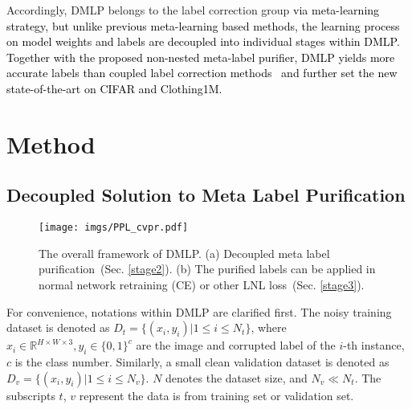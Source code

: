 \documentclass[10pt,twocolumn,letterpaper]{article}
\newcommand{\zbs}[1]{\textcolor{black}{#1}}
\begin{document}
Accordingly, DMLP belongs to the label correction group \zbs{via meta-learning strategy, but unlike previous meta-learning based methods, the learning process on model weights and labels are decoupled into individual stages within DMLP. Together with the proposed non-nested meta-label purifier, DMLP yields more accurate labels than coupled label correction methods~\cite{AAAI-2021-meta,zheng2021meta} and further set the new state-of-the-art on CIFAR and Clothing1M.}






\section{Method} \label{Method}
\subsection{Decoupled Solution to Meta Label Purification}
\begin{figure*}[!t]
\centering
\texttt{[image: imgs/PPL\_cvpr.pdf]}
\vspace{-3mm}
\caption{The overall framework of DMLP. (a) Decoupled meta label purification~(Sec. \ref{stage2}). (b) The purified labels can be applied in normal network retraining (CE) or other LNL loss~(Sec. \ref{stage3}).}\vspace{-3.5mm}
\label{fig:framework}
\end{figure*}


For convenience, notations within DMLP are clarified first. The noisy training dataset is denoted as $D_t=\{(x_i,y_i)|1\leq i \leq N_t\}$, where $x_i \in \mathbb{R}^{H\times W\times 3}, y_i \in \{0,1\}^c$ are the image and corrupted label of the $i$-th instance, $c$ is the class number. Similarly, a small clean validation dataset is denoted as $D_v=\{(x_i,y_i)|1\leq i \leq N_v\}$. $N$ denotes the dataset size, {and $N_v \ll N_t $}. The subscripts $t$, $v$ represent the data is from training set or validation set. 
\end{document}
